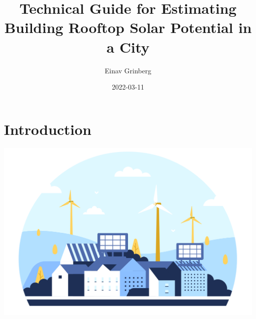 \documentclass[
]{book}
\title{Technical Guide for Estimating Building Rooftop Solar Potential in a City}
\author{Einav Grinberg}
\date{2022-03-11}
\begin{document}
\maketitle

{
\setcounter{tocdepth}{1}
\tableofcontents
}
\hypertarget{introduction}{%
\chapter*{Introduction}\label{introduction}}

\begin{center}\includegraphics[width=0.8\linewidth]{images/pic_tg} \end{center}
\end{document}
